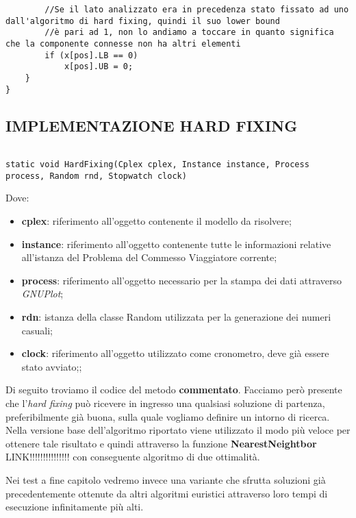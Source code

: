 \documentclass[11pt]{article}
\begin{document}
\begin{lstlisting}
        //Se il lato analizzato era in precedenza stato fissato ad uno dall'algoritmo di hard fixing, quindi il suo lower bound
        //è pari ad 1, non lo andiamo a toccare in quanto significa che la componente connesse non ha altri elementi
        if (x[pos].LB == 0)
            x[pos].UB = 0;
    }
}

\end{lstlisting}

\subsection*{IMPLEMENTAZIONE HARD FIXING}
\label{sec:ImplHardFixingS}

\begin{lstlisting}

static void HardFixing(Cplex cplex, Instance instance, Process process, Random rnd, Stopwatch clock)

\end{lstlisting}

Dove:

\begin{itemize}
    \item \textbf{cplex}: riferimento all'oggetto contenente il modello da risolvere;
    \item \textbf{instance}: riferimento all'oggetto contenente tutte le informazioni relative all'istanza del Problema del Commesso Viaggiatore corrente;
    \item \textbf{process}: riferimento all'oggetto necessario per la stampa dei dati attraverso \textit{GNUPlot};
    \item \textbf{rdn}: istanza della classe Random utilizzata per la generazione dei numeri casuali;
    \item \textbf{clock}: riferimento all'oggetto utilizzato come cronometro, deve già essere stato avviato;;
\end{itemize}

Di seguito troviamo il codice del metodo \textbf{commentato}. Facciamo però presente che l'\textit{hard fixing} può ricevere in ingresso una qualsiasi soluzione di partenza, preferibilmente già buona, sulla quale vogliamo definire un intorno di ricerca. Nella versione base dell'algoritmo riportato viene utilizzato il modo più veloce per ottenere tale risultato e quindi attraverso la funzione \textbf{NearestNeightbor} LINK!!!!!!!!!!!!!!! con conseguente algoritmo di due ottimalità.

Nei test a fine capitolo vedremo invece una variante che sfrutta soluzioni già precedentemente ottenute da altri algoritmi euristici attraverso loro tempi di esecuzione infinitamente più alti.
\end{document}
